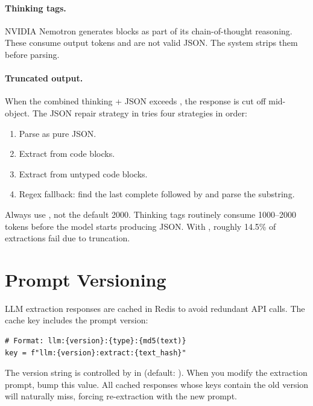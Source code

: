\paragraph{Thinking tags.}
NVIDIA Nemotron generates  blocks as part of its
chain-of-thought reasoning.  These consume output tokens and are not valid
JSON.  The system strips them before parsing.

\paragraph{Truncated output.}
When the combined thinking + JSON exceeds , the response
is cut off mid-object.  The JSON repair strategy in
 tries four strategies in order:

\begin{enumerate}
  \item Parse as pure JSON.
  \item Extract from  code blocks.
  \item Extract from untyped \ic{\`{}\`{}\`{}} code blocks.
  \item Regex fallback: find the last complete \ic{\}} followed by
        \ic{]} and parse the substring.
\end{enumerate}

\begin{warning}
Always use , not the default 2000.  Thinking tags
routinely consume 1000--2000 tokens before the model starts producing
JSON.  With , roughly 14.5\% of extractions fail
due to truncation.
\end{warning}


\section{Prompt Versioning}
\label{sec:prompt-versioning}

LLM extraction responses are cached in Redis to avoid redundant API calls.
The cache key includes the prompt version:

\begin{lstlisting}[style=python, numbers=none]
# Format: llm:{version}:{type}:{md5(text)}
key = f"llm:{version}:extract:{text_hash}"
\end{lstlisting}

The version string is controlled by
 in
 (default: ).  When you modify the
extraction prompt, bump this value.  All cached responses whose keys
contain the old version will naturally miss, forcing re-extraction with the
new prompt.

